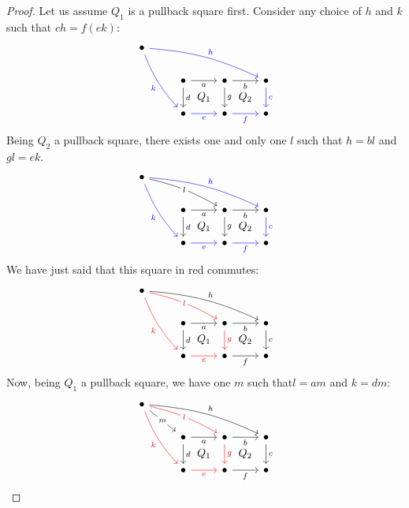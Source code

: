 \begin{proof}
Let us assume \(Q_1\) is a pullback square first. Consider any choice of \(h\) and \(k\) such that \(ch = f(ek)\):
\[\begin{tikzcd}
\bullet \ar["h", bend left=10, drrr, blue] \ar["k", bend right=10, ddr, swap, blue] & & & \\
& \bullet \ar["a", r, swap] \ar["d", d] \ar["{Q_1}", dr, phantom] & \bullet \ar["b", r, swap] \ar["g", d] \ar["{Q_2}", dr, phantom] & \bullet \ar["c", d, blue]\\
& \bullet \ar["e", r, swap, blue] & \bullet \ar["f", r, swap, blue] & \bullet
\end{tikzcd}\]
Being \(Q_2\) a pullback square, there exists one and only one \(l\) such that \(h = bl\) and \(gl = ek\).
\[\begin{tikzcd}
\bullet \ar["h", bend left=10, drrr, blue] \ar["k", bend right=10, ddr, swap, blue] \ar["l"{description}, bend left=8, drr] & & & \\
& \bullet \ar["a", r, swap] \ar["d", d] \ar["{Q_1}", dr, phantom] & \bullet \ar["b", r, swap] \ar["g", d] \ar["{Q_2}", dr, phantom] & \bullet \ar["c", d, blue]\\
& \bullet \ar["e", r, swap, blue] & \bullet \ar["f", r, swap, blue] & \bullet
\end{tikzcd}\]
We have just said that this square in red commutes:
\[\begin{tikzcd}
\bullet \ar["h", bend left=10, drrr] \ar["k", bend right=10, ddr, swap, red] \ar["l"{description}, drr, bend left=8, red] & & & \\
& \bullet \ar["a", r, swap] \ar["d", d] \ar["{Q_1}", dr, phantom] & \bullet \ar["b", r, swap] \ar["g", d, red] \ar["{Q_2}", dr, phantom] & \bullet \ar["c", d]\\
& \bullet \ar["e", r, swap, red] & \bullet \ar["f", r, swap] & \bullet
\end{tikzcd}\]
Now, being \(Q_1\) a pullback square, we have one \(m\) such that\(l = am\) and \(k = dm\):
\[\begin{tikzcd}
\bullet \ar["h", bend left=10, drrr] \ar["k", bend right=10, ddr, swap, red] \ar["l"{description}, drr, bend left=8, red] \ar["m"{description}, dr] & & & \\
& \bullet \ar["a", r, swap] \ar["d", d] \ar["{Q_1}", dr, phantom] & \bullet \ar["b", r, swap] \ar["g", d, red] \ar["{Q_2}", dr, phantom] & \bullet \ar["c", d]\\
& \bullet \ar["e", r, swap, red] & \bullet \ar["f", r, swap] & \bullet
\end{tikzcd}\]

\end{proof}
